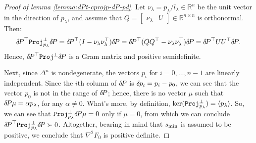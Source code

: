 \documentclass[smallcondensed]{svjour3}
\begin{document}
\begin{proof}[Proof of lemma \ref{lemma:dPt-cprojp-dP-pd}]

  Let $\nu_\lambda = p_\lambda/l_\lambda \in \mathbb{R}^n$ be the unit
  vector in the direction of $p_\lambda$, and assume that
  $Q = \begin{bmatrix} \nu_\lambda & U \end{bmatrix} \in \mathbb{R}^{n
    \times n}$ is orthonormal. Then:
  \begin{equation}
    {\delta \hspace{-0.14em} P}^\top \mathtt{Proj}^\perp_{p_\lambda} {\delta \hspace{-0.14em} P} = {\delta \hspace{-0.14em} P}^\top {(I - \nu_\lambda \nu_\lambda^\top)} {\delta \hspace{-0.14em} P} = {\delta \hspace{-0.14em} P}^\top {(QQ^\top - \nu_\lambda \nu_\lambda^\top)} {\delta \hspace{-0.14em} P} = {\delta \hspace{-0.14em} P}^\top U U^\top {\delta \hspace{-0.14em} P}.
  \end{equation}
  Hence, ${\delta \hspace{-0.14em} P}^\top \mathtt{Proj}^\perp {\delta \hspace{-0.14em} P}$ is a Gram matrix
  and positive semidefinite.

  Next, since $\Delta^n$ is nondegenerate, the vectors $p_i$ for
  $i = 0, \hdots, n - 1$ are linearly independent. Since the $i$th
  column of ${\delta \hspace{-0.14em} P}$ is ${\delta \hspace{-0.08em} p}_i = p_i - p_0$, we can see that
  the vector $p_0$ is not in the range of ${\delta \hspace{-0.14em} P}$; hence, there is
  no vector $\mu$ such that ${\delta \hspace{-0.14em} P} \mu = \alpha p_\lambda$, for any
  $\alpha \neq 0$. What's more, by definition,
  $\text{ker}(\mathtt{Proj}_{p_\lambda}^\perp) = \langle p_\lambda
  \rangle$. So, we can see that
  $\mathtt{Proj}^\perp_{p_\lambda} {\delta \hspace{-0.14em} P} \mu = 0$ only if $\mu = 0$,
  from which we can conclude
  ${\delta \hspace{-0.14em} P}^\top \mathtt{Proj}^\perp_{p_\lambda} {\delta \hspace{-0.14em} P} \succ
  0$. Altogether, bearing in mind that $s_{\operatorname{min}}$ is assumed to be
  positive, we conclude that $\nabla^2 F_0$ is positive definite.
\end{proof}
\end{document}
